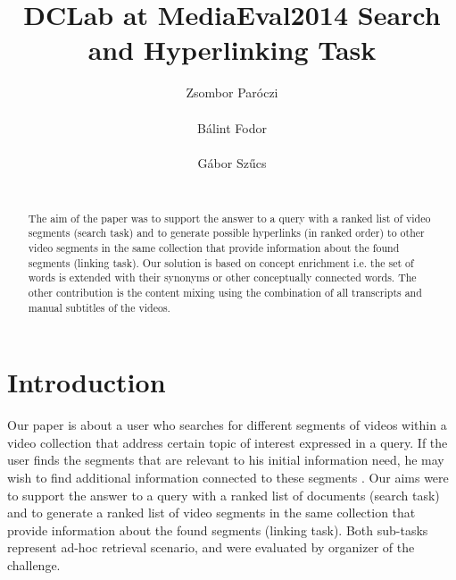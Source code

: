\documentclass{acm_proc_article-me}
\begin{document}

\title{DCLab at MediaEval2014 Search and Hyperlinking Task}


\author{
\alignauthor
Zsombor Par\'oczi\\
       \\
\alignauthor
B\'alint Fodor\\
       \\
\alignauthor
G\'abor Sz\H ucs \\
       \\
}

\maketitle
\begin{abstract}
The aim of the paper was to support the answer to a query with a ranked list of video segments (search task) and to generate possible hyperlinks (in ranked order) to other video segments in the same collection that provide information about the found segments (linking task). Our solution is based on concept enrichment i.e. the set of words is extended with their synonyms or other conceptually connected words. The other contribution is the content mixing using the combination of all transcripts and manual subtitles of the videos.
\end{abstract}

\section{Introduction}
Our paper is about a user who searches for different segments of videos within a video collection that address certain topic of interest expressed in a query. If the user finds the segments that are relevant to his initial information need, he may wish to find additional information connected to these segments \cite{eskevich2014search}. Our aims were to support the answer to a query with a ranked list of documents (search task) and to generate a ranked list of video segments in the same collection that provide information about the found segments (linking task). Both sub-tasks represent ad-hoc retrieval scenario, and were evaluated by organizer of the challenge. 
\end{document}
